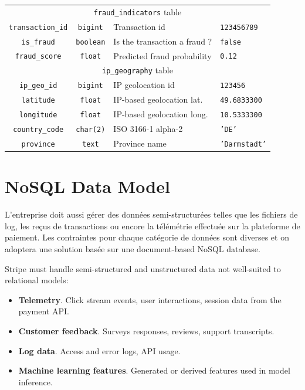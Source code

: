 \documentclass[11pt,a4paper,computermodern]{article}
\newcommand{\code}{\texttt}
\begin{document}
\begin{table}[ht]
\begin{threeparttable}
\begin{tabularx}{0.99\textwidth}{c c >{\centering\arraybackslash}X >{\centering\arraybackslash}X}
			\midrule
			\multicolumn{4}{c}{\code{fraud\_indicators} table}\\
			\code{transaction\_id} & \code{bigint} & Transaction id & \code{123456789} \\
			\code{is\_fraud} & \code{boolean} & Is the transaction a fraud ? & \code{false} \\
			\code{fraud\_score} & \code{float} & Predicted fraud probability & \code{0.12} \\
			
			\midrule
			\multicolumn{4}{c}{\code{ip\_geography} table}\\
			\code{ip\_geo\_id} & \code{bigint} & IP geolocation id & \code{123456} \\
			\code{latitude} & \code{float} & IP-based geolocation lat. & \code{49.6833300} \\
			\code{longitude} & \code{float} & IP-based geolocation long. & \code{10.5333300} \\
			\code{country\_code} & \code{char(2)} & ISO 3166-1 alpha-2 & \code{'DE'} \\
			\code{province} & \code{text} & Province name & \code{'Darmstadt'} \\
			
			\bottomrule
		\end{tabularx}
	\end{threeparttable}
\end{table}


\section*{NoSQL Data Model}

L'entreprise doit aussi gérer des données semi-structurées telles que les fichiers de log, les reçus de transactions ou encore la télémétrie effectuée sur la plateforme de paiement. Les contraintes pour chaque catégorie de données sont diverses et on adoptera une solution basée sur une document-based NoSQL database.

Stripe must handle semi-structured and unstructured data not well-suited to relational models:
\begin{itemize}[itemsep=5pt, parsep=0pt]
	\item \textbf{Telemetry}. Click stream events, user interactions, session data from the payment API.
	\item \textbf{Customer feedback}. Surveys responses, reviews, support transcripts.
	\item \textbf{Log data}. Access and error logs, API usage.
	\item \textbf{Machine learning features}. Generated or derived features used in model inference.
\end{itemize}
\end{document}
